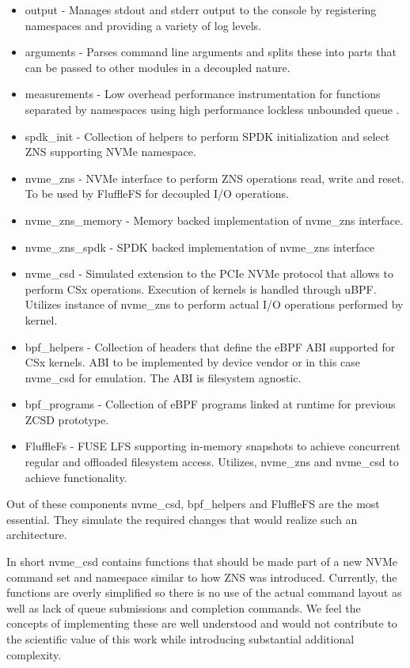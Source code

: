 \begin{itemize}
    \item output - Manages stdout and stderr output to the console by
    registering namespaces and providing a variety of log levels.
    \item arguments - Parses command line arguments and splits these into parts
    that can be passed to other modules in a decoupled nature. 
    \item measurements - Low overhead performance instrumentation for functions
    separated by namespaces using high performance lockless unbounded queue
    \cite{Michael1996SimpleFA}.
    \item spdk\_init - Collection of helpers to perform SPDK initialization and
    select ZNS supporting NVMe namespace.
    \item nvme\_zns - NVMe interface to perform ZNS operations read, write and
    reset. To be used by FluffleFS for decoupled I/O operations.
    \item nvme\_zns\_memory - Memory backed implementation of nvme\_zns
    interface.
    \item nvme\_zns\_spdk - SPDK backed implementation of nvme\_zns interface
    \item nvme\_csd - Simulated extension to the PCIe NVMe protocol that allows
    to perform CSx operations. Execution of kernels is handled through uBPF.
    Utilizes instance of nvme\_zns to perform actual I/O operations performed by
    kernel.
    \item bpf\_helpers - Collection of headers that define the eBPF ABI
    supported for CSx kernels. ABI to be implemented by device vendor
    or in this case nvme\_csd for emulation. The ABI is filesystem agnostic.
    \item bpf\_programs - Collection of eBPF programs linked at runtime for
    previous ZCSD \cite{lukken2021zcsd} prototype.
    \item FluffleFs - FUSE LFS supporting in-memory snapshots to achieve
    concurrent regular and offloaded filesystem access. Utilizes, nvme\_zns and
    nvme\_csd to achieve functionality.
\end{itemize}

Out of these components nvme\_csd, bpf\_helpers and FluffleFS are the most
essential. They simulate the required changes that would realize such an
architecture.

In short nvme\_csd contains functions that should be made part of a new NVMe
command set and namespace \cite{nvme-command} similar to how ZNS was introduced.
Currently, the functions are overly simplified so there is no use of the actual
command layout as well as lack of queue submissions and completion commands. We
feel the concepts of implementing these are well understood and would not
contribute to the scientific value of this work while introducing substantial
additional complexity.


